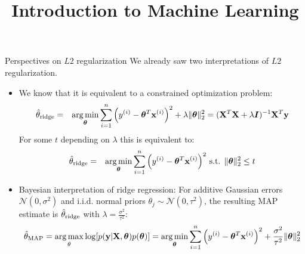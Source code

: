 \documentclass[11pt,compress,t,notes=noshow, xcolor=table]{beamer}
\title{Introduction to Machine Learning}
\begin{document}




\begin{vbframe}{Perspectives on $L2$ regularization}
We already saw two interpretations of $L2$ regularization. 
{\small
\begin{itemize}\setlength\itemsep{0.8em}
\item We know that it is equivalent to a constrained optimization problem:
  \begin{eqnarray*}  
  \hat{\theta}_{\text{ridge}} &=& \operatorname*{arg\,min}_{\bm{\theta}} \sum\limits_{i=1}^n \left(y^{(i)} - \bm{\theta}^T \mathbf{x}^{(i)} \right)^2 + \lambda \|\bm{\theta}\|_2^2 = ({\mathbf{X}}^T \mathbf{X}  + \lambda \bm{I})^{-1} \mathbf{X}^T\mathbf{y}\\
 \end{eqnarray*}
  For some $t$ depending on $\lambda$ this is equivalent to:
  \begin{eqnarray*}
  \hat{\theta}_{\text{ridge}}&=& \operatorname*{arg\,min}_{\bm{\theta}} \sum\limits_{i=1}^n \left(y^{(i)} - \bm{\theta}^T \mathbf{x}^{(i)}\right)^2 \,
  \text{s.t. } \|\bm{\theta}\|_2^2  \leq t
  \end{eqnarray*}
  \item Bayesian interpretation of ridge regression: For additive Gaussian errors $\mathcal{N}(0,\sigma^2)$ and i.i.d. normal priors $\theta_j \sim \mathcal{N}(0,\tau^{2})$, the resulting MAP estimate is $\hat{\theta}_{\text{ridge}}$ with $\lambda=\frac{\sigma^2}{\tau^2}$:
  $$\hat{\theta}_{\text{MAP}}=\operatorname*{arg\,max}_{\theta} \log[p(\mathbf{y}|\mathbf{X},\bm{\theta})p(\bm{\theta})] = \operatorname*{arg\,min}_{\bm{\theta}} \sum\limits_{i=1}^n \left(y^{(i)} - \bm{\theta}^T \mathbf{x}^{(i)} \right)^2 + \frac{\sigma^2}{\tau^2} \|\bm{\theta}\|_2^2$$
\end{itemize}
}
\end{vbframe}
\end{document}
